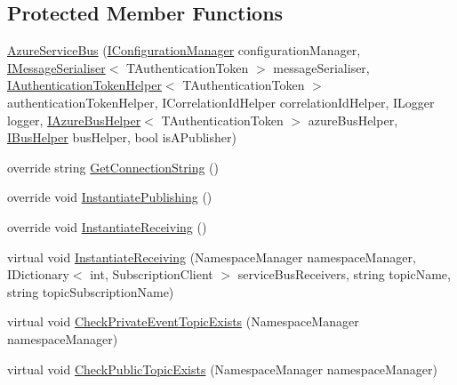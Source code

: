 \subsection*{Protected Member Functions}
\begin{DoxyCompactItemize}
\item 
\hyperlink{classCqrs_1_1Azure_1_1ServiceBus_1_1AzureServiceBus_a44845c00c29574c2fa2d43a8a6b124ca}{Azure\+Service\+Bus} (\hyperlink{interfaceCqrs_1_1Configuration_1_1IConfigurationManager}{I\+Configuration\+Manager} configuration\+Manager, \hyperlink{interfaceCqrs_1_1Azure_1_1ServiceBus_1_1IMessageSerialiser}{I\+Message\+Serialiser}$<$ T\+Authentication\+Token $>$ message\+Serialiser, \hyperlink{interfaceCqrs_1_1Authentication_1_1IAuthenticationTokenHelper}{I\+Authentication\+Token\+Helper}$<$ T\+Authentication\+Token $>$ authentication\+Token\+Helper, I\+Correlation\+Id\+Helper correlation\+Id\+Helper, I\+Logger logger, \hyperlink{interfaceCqrs_1_1Azure_1_1ServiceBus_1_1IAzureBusHelper}{I\+Azure\+Bus\+Helper}$<$ T\+Authentication\+Token $>$ azure\+Bus\+Helper, \hyperlink{interfaceCqrs_1_1Bus_1_1IBusHelper}{I\+Bus\+Helper} bus\+Helper, bool is\+A\+Publisher)
\item 
override string \hyperlink{classCqrs_1_1Azure_1_1ServiceBus_1_1AzureServiceBus_a5a3b3610dc5dfebe586262c0bc787748}{Get\+Connection\+String} ()
\item 
override void \hyperlink{classCqrs_1_1Azure_1_1ServiceBus_1_1AzureServiceBus_a5c286d29b0bbfe3770f3407efda57036}{Instantiate\+Publishing} ()
\item 
override void \hyperlink{classCqrs_1_1Azure_1_1ServiceBus_1_1AzureServiceBus_ad49a2d063279ec98443e7f1d69178cfa}{Instantiate\+Receiving} ()
\item 
virtual void \hyperlink{classCqrs_1_1Azure_1_1ServiceBus_1_1AzureServiceBus_adba7b34f05055ed65baa54435a68321c}{Instantiate\+Receiving} (Namespace\+Manager namespace\+Manager, I\+Dictionary$<$ int, Subscription\+Client $>$ service\+Bus\+Receivers, string topic\+Name, string topic\+Subscription\+Name)
\item 
virtual void \hyperlink{classCqrs_1_1Azure_1_1ServiceBus_1_1AzureServiceBus_a13484259317dd6a936ff9269480674a1}{Check\+Private\+Event\+Topic\+Exists} (Namespace\+Manager namespace\+Manager)
\item 
virtual void \hyperlink{classCqrs_1_1Azure_1_1ServiceBus_1_1AzureServiceBus_aae464d1d93ae6600ff5ace028160dd3c}{Check\+Public\+Topic\+Exists} (Namespace\+Manager namespace\+Manager)
\item 

\end{DoxyCompactItemize}
